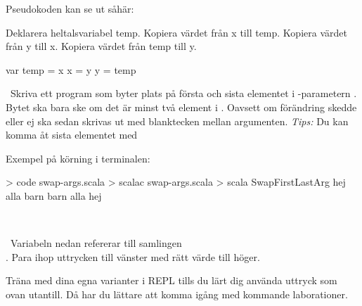 \TaskSolved \what

\SubtaskSolved  Pseudokoden kan se ut såhär:
\begin{Code}
Deklarera heltalsvariabel temp.
Kopiera värdet från x till temp.
Kopiera värdet från y till x.
Kopiera värdet från temp till y.
\end{Code}

\SubtaskSolved
\begin{Code}
var temp = x
x = y
y = temp
\end{Code}

\QUESTEND





\QUESTBEGIN

\Task \what~Skriva ett program som byter plats på första och sista elementet i -parametern . Bytet ska bara ske om det är minst två element i . Oavsett om förändring skedde eller ej ska  sedan skrivas ut med blanktecken mellan argumenten.
  \emph{Tips:} Du kan komma åt sista elementet med 

Exempel på körning i terminalen:
\begin{REPL}
> code swap-args.scala
> scalac swap-args.scala
> scala SwapFirstLastArg hej alla barn
barn alla hej
\end{REPL}

\SOLUTION

\TaskSolved \what~


\QUESTEND




\QUESTBEGIN

\Task \what~Variabeln  nedan refererar till samlingen \\. Para ihop uttrycken till vänster med rätt värde till höger.

\begin{ConceptConnections}

\end{ConceptConnections}

\noindent Träna med dina egna varianter i REPL tills du lärt dig använda uttryck som ovan utantill. Då har du lättare att komma igång med kommande laborationer.

\SOLUTION

